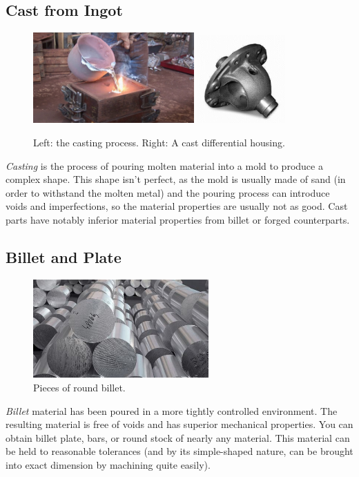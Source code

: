 \documentclass[10pt,letterpaper]{book}
\begin{document}
 \subsection{Cast from Ingot}
 
\begin{figure}[H]
	\includegraphics[width=0.55\textwidth]{imgs/casting_proc.jpeg}
	\qquad
	\includegraphics[width=0.3\textwidth]{imgs/casting_part.jpeg}
	\caption{Left: the casting process. Right: A cast differential housing.}
\end{figure} 
 \textit{Casting} is the process of pouring molten material into a mold to produce a complex shape. This shape isn't perfect, as the mold is usually made of sand (in order to withstand the molten metal) and the pouring process can introduce voids and imperfections, so the material properties are usually not as good. Cast parts have notably inferior material properties from billet or forged counterparts.
 
 \subsection{Billet and Plate}
 
 \begin{figure}[H]
	\includegraphics[width=0.6\textwidth]{imgs/billet.jpeg}
	\caption{Pieces of round billet.}
\end{figure} 
 \textit{Billet} material has been poured in a more tightly controlled environment. The resulting material is free of voids and has superior mechanical properties. You can obtain billet plate, bars, or round stock of nearly any material. This material can be held to reasonable tolerances (and by its simple-shaped nature, can be brought into exact dimension by machining quite easily).
 
\end{document}

